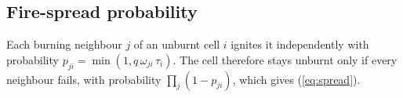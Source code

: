 \subsection{Fire-spread probability}
Each burning neighbour $j$ of an unburnt cell $i$ ignites it independently with probability
$p_{ji} = \min(1, q\,\omega_{ji}\,\tau_i)$. The cell therefore stays unburnt only if every
neighbour fails, with probability $\prod_j (1 - p_{ji})$, which gives (\ref{eq:spread}).
